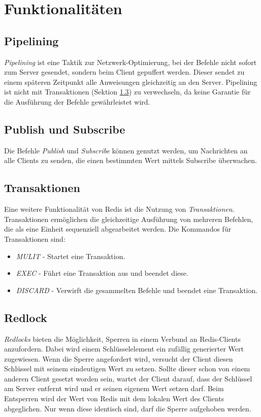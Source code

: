 \documentclass[12pt, letterpaper]{article}
\begin{document}
\section{Funktionalitäten}
\subsection{Pipelining}
\textit{Pipelining}\cite{pipelining} ist eine Taktik zur Netzwerk-Optimierung, bei der Befehle nicht sofort zum Server gesendet, sondern beim Client gepuffert werden. Dieser sendet zu einem späteren Zeitpunkt alle Anweisungen gleichzeitig an den Server. Pipelining ist nicht mit Transaktionen (Sektion \ref{sec:transaktionen}) zu verwechseln, da keine Garantie für die Ausführung der Befehle gewährleistet wird.

\subsection{Publish und Subscribe}
Die Befehle \textit{Publish} und \textit{Subscribe} können genutzt werden, um Nachrichten an alle Clients zu senden, die einen bestimmten Wert mittels Subscribe überwachen\cite{subpub}. 

\subsection{Transaktionen}\label{sec:transaktionen}
Eine weitere Funktionalität von Redis ist die Nutzung von \textit{Transaktionen}\cite{transaktion}. Transaktionen ermöglichen die gleichzeitige Ausführung von mehreren Befehlen, die als eine Einheit sequenziell abgearbeitet werden\cite{transaktion}.
Die Kommandos für Transaktionen sind:
\begin{itemize}
    \item \textit{MULIT} - Startet eine Transaktion.
    \item \textit{EXEC} - Führt eine Transaktion aus und beendet diese.
    \item \textit{DISCARD} - Verwirft die gesammelten Befehle und beendet eine Transaktion.
\end{itemize}

\subsection{Redlock}
\textit{Redlocks}\cite{redlock} bieten die Möglichkeit, Sperren in einem Verbund an Redis-Clients anzufordern. Dabei wird einem Schlüsselelement ein zufällig generierter Wert zugewiesen. Wenn die Sperre angefordert wird, versucht der Client diesen Schlüssel mit seinem eindeutigen Wert zu setzen. Sollte dieser schon von einem anderen Client gesetzt worden sein, wartet der Client darauf, dass der Schlüssel am Server entfernt wird und er seinen eigenem Wert setzen darf. Beim Entsperren wird der Wert von Redis mit dem lokalen Wert des Clients abgeglichen. Nur wenn diese identisch sind, darf die Sperre aufgehoben werden.
\end{document}
